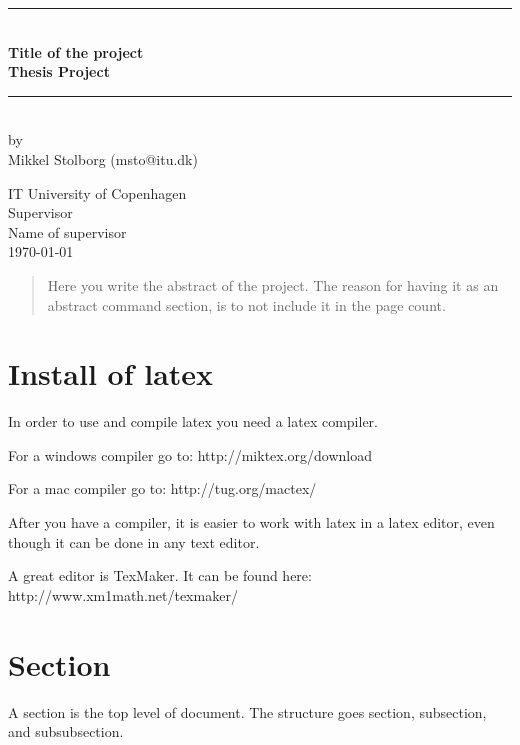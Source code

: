 \documentclass[a4paper,11pt]{article}
\begin{document}
\lstset{language=C}  

\begin{titlepage}
\centering \parindent=0pt
\newcommand{\HRule}{\rule{\textwidth}{1mm}}
 \HRule\\[1cm]\large\bfseries
Title of the project\\[0.7cm]
\large Thesis Project\\[1cm]
\HRule\\[1cm]


\large by 
\\Mikkel Stolborg (msto@itu.dk)
 \normalsize
\begin{flushleft}
IT University of Copenhagen \\
Supervisor\\
Name of supervisor\\
\today \end{flushleft}
\end{titlepage}

\begin{abstract}
Here you write the abstract of the project. The reason for having it as an abstract command section, is to not include it in the page count.
\end{abstract}
\pagebreak
\tableofcontents
\pagebreak
\section{Install of latex}
In order to use and compile latex you need a latex compiler.

For a windows compiler go to: http://miktex.org/download

For a mac compiler go to: http://tug.org/mactex/

After you have a compiler, it is easier to work with latex in a latex editor, even though it can be done in any text editor. 

A great editor is TexMaker. It can be found here: http://www.xm1math.net/texmaker/
\section{Section}
A section is the top level of document. The structure goes section, subsection, and subsubsection.
\end{document}
